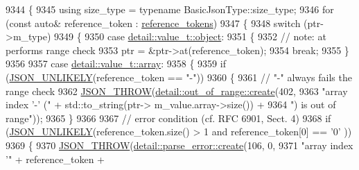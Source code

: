\begin{DoxyCode}
9344     \{
9345         \textcolor{keyword}{using} size\_type = \textcolor{keyword}{typename} BasicJsonType::size\_type;
9346         \textcolor{keywordflow}{for} (\textcolor{keyword}{const} \textcolor{keyword}{auto}& reference\_token : \hyperlink{classnlohmann_1_1json__pointer_a07a990a6838de4f38ee9d881e7b9fd61}{reference\_tokens})
9347         \{
9348             \textcolor{keywordflow}{switch} (ptr->m\_type)
9349             \{
9350                 \textcolor{keywordflow}{case} \hyperlink{namespacenlohmann_1_1detail_a1ed8fc6239da25abcaf681d30ace4985aa8cfde6331bd59eb2ac96f8911c4b666}{detail::value\_t::object}:
9351                 \{
9352                     \textcolor{comment}{// note: at performs range check}
9353                     ptr = &ptr->at(reference\_token);
9354                     \textcolor{keywordflow}{break};
9355                 \}
9356 
9357                 \textcolor{keywordflow}{case} \hyperlink{namespacenlohmann_1_1detail_a1ed8fc6239da25abcaf681d30ace4985af1f713c9e000f5d3f280adbd124df4f5}{detail::value\_t::array}:
9358                 \{
9359                     \textcolor{keywordflow}{if} (\hyperlink{json_8hpp_ab77582407c64944e7db1ea95ab520253}{JSON\_UNLIKELY}(reference\_token == \textcolor{stringliteral}{"-"}))
9360                     \{
9361                         \textcolor{comment}{// "-" always fails the range check}
9362                         \hyperlink{json_8hpp_a6c274f6db2e65c1b66c7d41b06ad690f}{JSON\_THROW}(\hyperlink{classnlohmann_1_1detail_1_1out__of__range_a3f6d82a6f967c4728a1ec735a7867073}{detail::out\_of\_range::create}(402,
9363                                                                 \textcolor{stringliteral}{"array index '-' ("} + std::to\_string(ptr->
      m\_value.array->size()) +
9364                                                                 \textcolor{stringliteral}{") is out of range"}));
9365                     \}
9366 
9367                     \textcolor{comment}{// error condition (cf. RFC 6901, Sect. 4)}
9368                     \textcolor{keywordflow}{if} (\hyperlink{json_8hpp_ab77582407c64944e7db1ea95ab520253}{JSON\_UNLIKELY}(reference\_token.size() > 1 and reference\_token[0] == \textcolor{charliteral}{'0'}
      ))
9369                     \{
9370                         \hyperlink{json_8hpp_a6c274f6db2e65c1b66c7d41b06ad690f}{JSON\_THROW}(\hyperlink{classnlohmann_1_1detail_1_1parse__error_a9fd60ad6bce80fd99686ad332faefd37}{detail::parse\_error::create}(106, 0,
9371                                                                \textcolor{stringliteral}{"array index '"} + reference\_token +

\end{DoxyCode}
